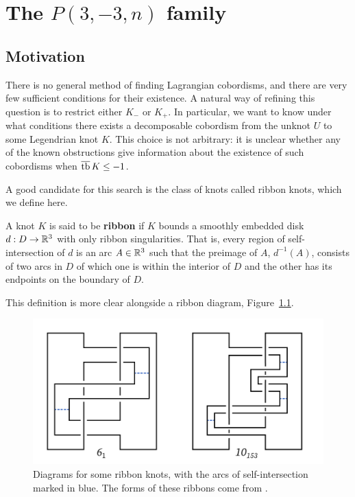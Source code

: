 \chapter{The \texorpdfstring{$P(3, -3, n)$}{P(3, -3, n)} family}\label{ch:pretzel}
\section{Motivation}\label{sec:motivation}
There is no general method of finding Lagrangian cobordisms, and there are very few sufficient conditions for their existence.
A natural way of refining this question is to restrict either $K_-$ or $K_+$.
In particular, we want to know under what conditions there exists a decomposable cobordism from the unknot $U$ to some Legendrian knot $K$. This choice is not arbitrary: it is unclear whether any of the known obstructions give information about the existence of such cobordisms when $\overline{\operatorname{tb}}\, K \leq -1$.

A good candidate for this search is the class of knots called ribbon knots, which we define here.

\begin{definition}
    A knot $K$ is said to be \textbf{ribbon} if $K$ bounds a smoothly embedded disk $d: D \to \mathbb{R}^3$ with only ribbon singularities.
    That is, every region of self-intersection of $d$ is an arc $A \in \mathbb{R}^3$ such that the preimage of $A$, $d^{-1} (A)$, consists of two arcs in $D$ of which one is within the interior of $D$ and the other has its endpoints on the boundary of $D$.
\end{definition}

This definition is more clear alongside a ribbon diagram, Figure~\ref{fig:ribbons}.

\begin{figure}[ht!]
    \centering
    \includegraphics[width=0.6\linewidth]{images/ribbons.pdf}
    \caption{Diagrams for some ribbon knots, with the arcs of self-intersection marked in blue. The forms of these ribbons come from \cite{kawauchi}.}
    \label{fig:ribbons}
\end{figure}

